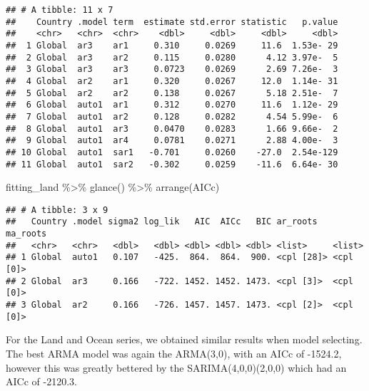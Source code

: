 \documentclass[
]{article}
\newenvironment{Shaded}{\begin{snugshade}}{\end{snugshade}}
\newcommand{\FunctionTok}[1]{\textcolor[rgb]{0.00,0.00,0.00}{#1}}
\newcommand{\NormalTok}[1]{#1}
\newcommand{\SpecialCharTok}[1]{\textcolor[rgb]{0.00,0.00,0.00}{#1}}
\begin{document}
\begin{verbatim}
## # A tibble: 11 x 7
##    Country .model term  estimate std.error statistic   p.value
##    <chr>   <chr>  <chr>    <dbl>     <dbl>     <dbl>     <dbl>
##  1 Global  ar3    ar1     0.310     0.0269     11.6  1.53e- 29
##  2 Global  ar3    ar2     0.115     0.0280      4.12 3.97e-  5
##  3 Global  ar3    ar3     0.0723    0.0269      2.69 7.26e-  3
##  4 Global  ar2    ar1     0.320     0.0267     12.0  1.14e- 31
##  5 Global  ar2    ar2     0.138     0.0267      5.18 2.51e-  7
##  6 Global  auto1  ar1     0.312     0.0270     11.6  1.12e- 29
##  7 Global  auto1  ar2     0.128     0.0282      4.54 5.99e-  6
##  8 Global  auto1  ar3     0.0470    0.0283      1.66 9.66e-  2
##  9 Global  auto1  ar4     0.0781    0.0271      2.88 4.00e-  3
## 10 Global  auto1  sar1   -0.701     0.0260    -27.0  2.54e-129
## 11 Global  auto1  sar2   -0.302     0.0259    -11.6  6.64e- 30
\end{verbatim}

\begin{Shaded}
\begin{Highlighting}[]
\NormalTok{fitting\_land }\SpecialCharTok{\%\textgreater{}\%} \FunctionTok{glance}\NormalTok{() }\SpecialCharTok{\%\textgreater{}\%} \FunctionTok{arrange}\NormalTok{(AICc)}
\end{Highlighting}
\end{Shaded}

\begin{verbatim}
## # A tibble: 3 x 9
##   Country .model sigma2 log_lik   AIC  AICc   BIC ar_roots   ma_roots 
##   <chr>   <chr>   <dbl>   <dbl> <dbl> <dbl> <dbl> <list>     <list>   
## 1 Global  auto1   0.107   -425.  864.  864.  900. <cpl [28]> <cpl [0]>
## 2 Global  ar3     0.166   -722. 1452. 1452. 1473. <cpl [3]>  <cpl [0]>
## 3 Global  ar2     0.166   -726. 1457. 1457. 1473. <cpl [2]>  <cpl [0]>
\end{verbatim}

For the Land and Ocean series, we obtained similar results when model
selecting. The best ARMA model was again the ARMA(3,0), with an AICc of
-1524.2, however this was greatly bettered by the SARIMA(4,0,0)(2,0,0)
which had an AICc of -2120.3.
\end{document}
